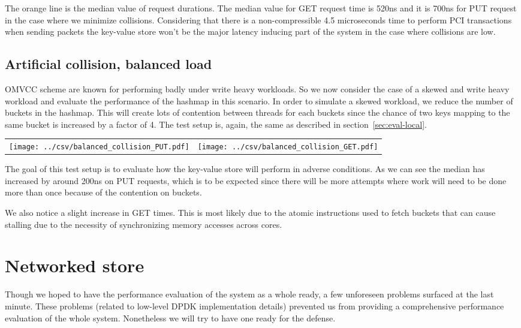 The orange line is the median value of request durations. The median
value for GET request time is 520ns and it is 700ns for PUT request in
the case where we minimize collisions. Considering that there is a
non-compressible 4.5 microseconds time to perform PCI transactions
when sending packets the key-value store won't be the major latency
inducing part of the system in the case where collisions are low.

\subsection{Artificial collision, balanced load}

OMVCC scheme are known for performing badly under write heavy
workloads. So we now consider the case of a skewed and write heavy
workload and evaluate the performance of the hashmap in this
scenario. In order to simulate a skewed workload, we reduce the number
of buckets in the hashmap. This will create lots of contention between
threads for each buckets since the chance of two keys mapping to the
same bucket is increased by a factor of 4. The test setup is, again,
the same as described in section~\ref{sec:eval-local}.

\begin{center}
  \begin{tabular}{c c} \label{table:col-balanced}
    \texttt{[image: ../csv/balanced\_collision\_PUT.pdf]}
    &
      \texttt{[image: ../csv/balanced\_collision\_GET.pdf]}
  \end{tabular}
\end{center}

The goal of this test setup is to evaluate how the key-value store
will perform in adverse conditions. As we can see the median has
increased by around 200ns on PUT requests, which is to be expected
since there will be more attempts where work will need to be done more
than once because of the contention on buckets.

We also notice a slight increase in GET times. This is most likely due
to the atomic instructions used to fetch buckets that can cause
stalling due to the necessity of synchronizing memory accesses across
cores.

\section{Networked store}

Though we hoped to have the performance evaluation of the system as a
whole ready, a few unforeseen problems surfaced at the last
minute. These problems (related to low-level DPDK implementation
details) prevented us from providing a comprehensive performance
evaluation of the whole system. Nonetheless we will try to have one
ready for the defense.

